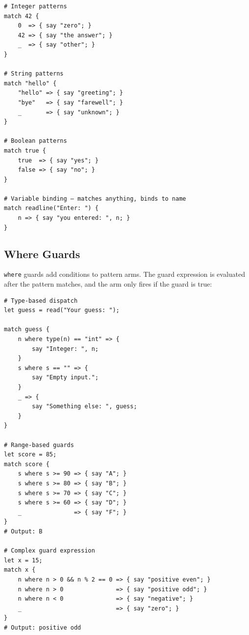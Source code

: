 \begin{tcolorbox}[colback=codebg, colframe=darkpurple, colbacktitle=darkpurple, title=\textbf{\textcolor{codegold}{Pattern Types}}, fonttitle=\bfseries, sharp corners]
\begin{lstlisting}
# Integer patterns
match 42 {
    0  => { say "zero"; }
    42 => { say "the answer"; }
    _  => { say "other"; }
}

# String patterns
match "hello" {
    "hello" => { say "greeting"; }
    "bye"   => { say "farewell"; }
    _       => { say "unknown"; }
}

# Boolean patterns
match true {
    true  => { say "yes"; }
    false => { say "no"; }
}

# Variable binding — matches anything, binds to name
match readline("Enter: ") {
    n => { say "you entered: ", n; }
}
\end{lstlisting}
\end{tcolorbox}

\subsection{Where Guards}

\texttt{where} guards add conditions to pattern arms. The guard expression is evaluated after the pattern matches, and the arm only fires if the guard is true:

\begin{tcolorbox}[colback=codebg, colframe=darkpurple, colbacktitle=darkpurple, title=\textbf{\textcolor{codegold}{Where Guards}}, fonttitle=\bfseries, sharp corners]
\begin{lstlisting}
# Type-based dispatch
let guess = read("Your guess: ");

match guess {
    n where type(n) == "int" => {
        say "Integer: ", n;
    }
    s where s == "" => {
        say "Empty input.";
    }
    _ => {
        say "Something else: ", guess;
    }
}

# Range-based guards
let score = 85;
match score {
    s where s >= 90 => { say "A"; }
    s where s >= 80 => { say "B"; }
    s where s >= 70 => { say "C"; }
    s where s >= 60 => { say "D"; }
    _               => { say "F"; }
}
# Output: B

# Complex guard expression
let x = 15;
match x {
    n where n > 0 && n % 2 == 0 => { say "positive even"; }
    n where n > 0               => { say "positive odd"; }
    n where n < 0               => { say "negative"; }
    _                           => { say "zero"; }
}
# Output: positive odd
\end{lstlisting}
\end{tcolorbox}

